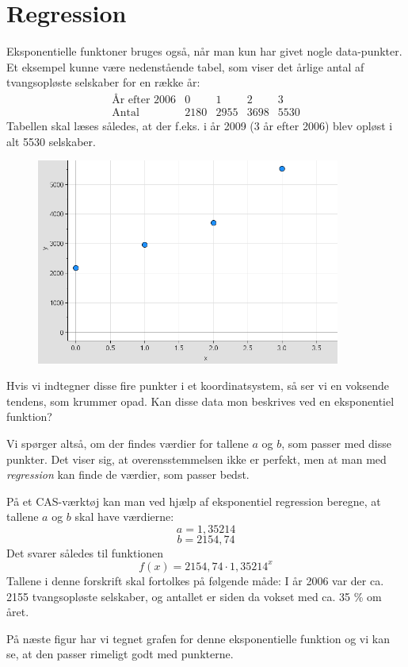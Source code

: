 \documentclass[12pt,oneside,a4paper]{article}
\begin{document}
\section{Regression}
Eksponentielle funktoner bruges også, når man kun har givet nogle
data-punkter. Et eksempel kunne være nedenstående tabel, som viser det årlige
antal af tvangsopløste selskaber for en række år:
$$
\begin{array}{l|c|c|c|c}
    \mbox{År efter 2006} & 0 & 1 & 2 & 3 \\
    \hline
    \mbox{Antal} & 2180 & 2955 & 3698 & 5530
\end{array}
$$
Tabellen skal læses således, at der f.eks. i år 2009 (3 år efter 2006) blev
opløst i alt 5530 selskaber.

\begin{figure}[ht]
    \centering
    \includegraphics[width=10cm]{eksp-eks1}
\end{figure}

Hvis vi indtegner disse fire punkter i et koordinatsystem, så ser vi en
voksende tendens, som krummer opad. Kan disse data mon beskrives ved en
eksponentiel funktion?

Vi spørger altså, om der findes værdier for tallene $a$ og $b$, som passer med
disse punkter. Det viser sig, at overensstemmelsen ikke er perfekt, men at man
med {\em regression} kan finde de værdier, som passer bedst.

På et CAS-værktøj kan man ved hjælp af eksponentiel regression beregne, at
tallene $a$ og $b$ skal have værdierne: 
$$
a = 1,35214
$$
$$
b = 2154,74
$$
Det svarer således til funktionen 
$$
f(x) = 2154,74 \cdot 1,35214 ^x
$$
Tallene i denne forskrift skal fortolkes på følgende måde: I år 2006 var der
ca. 2155 tvangsopløste selskaber, og antallet er siden da vokset med ca. 35 \%
om året.

På næste figur har vi tegnet grafen for denne eksponentielle funktion og vi kan
se, at den passer rimeligt godt med punkterne.
\end{document}
